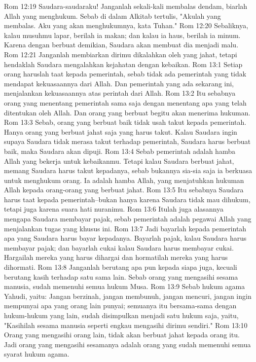Rom 12:19  Saudara-saudaraku! Janganlah sekali-kali membalas dendam, biarlah Allah yang menghukum. Sebab di dalam Alkitab tertulis, "Akulah yang membalas. Aku yang akan menghukumnya, kata Tuhan."
Rom 12:20  Sebaliknya, kalau musuhmu lapar, berilah ia makan; dan kalau ia haus, berilah ia minum. Karena dengan berbuat demikian, Saudara akan membuat dia menjadi malu.
Rom 12:21  Janganlah membiarkan dirimu dikalahkan oleh yang jahat, tetapi hendaklah Saudara mengalahkan kejahatan dengan kebaikan.
Rom 13:1  Setiap orang haruslah taat kepada pemerintah, sebab tidak ada pemerintah yang tidak mendapat kekuasaannya dari Allah. Dan pemerintah yang ada sekarang ini, menjalankan kekuasaannya atas perintah dari Allah.
Rom 13:2  Itu sebabnya orang yang menentang pemerintah sama saja dengan menentang apa yang telah ditentukan oleh Allah. Dan orang yang berbuat begitu akan menerima hukuman.
Rom 13:3  Sebab, orang yang berbuat baik tidak usah takut kepada pemerintah. Hanya orang yang berbuat jahat saja yang harus takut. Kalau Saudara ingin supaya Saudara tidak merasa takut terhadap pemerintah, Saudara harus berbuat baik, maka Saudara akan dipuji.
Rom 13:4  Sebab pemerintah adalah hamba Allah yang bekerja untuk kebaikanmu. Tetapi kalau Saudara berbuat jahat, memang Saudara harus takut kepadanya, sebab bukannya sia-sia saja ia berkuasa untuk menghukum orang. Ia adalah hamba Allah, yang menjatuhkan hukuman Allah kepada orang-orang yang berbuat jahat.
Rom 13:5  Itu sebabnya Saudara harus taat kepada pemerintah--bukan hanya karena Saudara tidak mau dihukum, tetapi juga karena suara hati nuranimu.
Rom 13:6  Itulah juga alasannya mengapa Saudara membayar pajak, sebab pemerintah adalah pegawai Allah yang menjalankan tugas yang khusus ini.
Rom 13:7  Jadi bayarlah kepada pemerintah apa yang Saudara harus bayar kepadanya. Bayarlah pajak, kalau Saudara harus membayar pajak; dan bayarlah cukai kalau Saudara harus membayar cukai. Hargailah mereka yang harus dihargai dan hormatilah mereka yang harus dihormati.
Rom 13:8  Janganlah berutang apa pun kepada siapa juga, kecuali berutang kasih terhadap satu sama lain. Sebab orang yang mengasihi sesama manusia, sudah memenuhi semua hukum Musa.
Rom 13:9  Sebab hukum agama Yahudi, yaitu: Jangan berzinah, jangan membunuh, jangan mencuri, jangan ingin mempunyai apa yang orang lain punyai; semuanya itu bersama-sama dengan hukum-hukum yang lain, sudah disimpulkan menjadi satu hukum saja, yaitu, "Kasihilah sesama manusia seperti engkau mengasihi dirimu sendiri."
Rom 13:10  Orang yang mengasihi orang lain, tidak akan berbuat jahat kepada orang itu. Jadi orang yang mengasihi sesamanya adalah orang yang sudah memenuhi semua syarat hukum agama.
